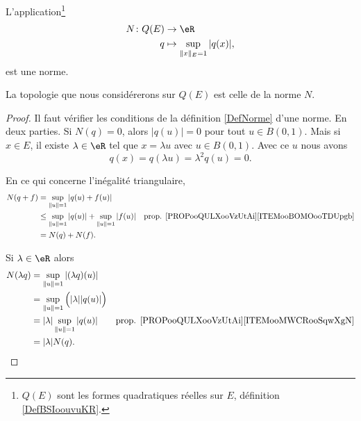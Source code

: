 \begin{lemma}       \label{LEMooWRCIooWkMpoF}
	L'application\footnote{\( Q(E)\) sont les formes quadratiques réelles sur \( E\), définition \ref{DefBSIoouvuKR}.}
	\begin{equation}  \label{EqZYBooZysmVh}
		\begin{aligned}
			N\colon Q(E) & \to \eR                            \\
			q            & \mapsto\sup_{\| x \|_E=1}| q(x) |,
		\end{aligned}
	\end{equation}
	est une norme.

	La topologie que nous considérerons sur \( Q(E)\) est celle de la norme \( N\).
\end{lemma}

\begin{proof}
	Il faut vérifier les conditions de la définition \ref{DefNorme} d'une norme. En deux parties.
	Si \( N(q)=0\), alors \( | q(u) |=0\) pour tout \( u\in B(0,1)\). Mais si \( x\in E\), il existe \( \lambda\in \eR\) tel que \( x=\lambda u\) avec \( u\in B(0,1)\). Avec ce \( u\) nous avons
	\begin{equation}
		q(x)=q(\lambda u)=\lambda^2q(u)=0.
	\end{equation}

	En ce qui concerne l'inégalité triangulaire,
	\begin{subequations}
		\begin{align}
			N(q+f) & =\sup_{\| u \|=1}| q(u)+f(u) |                                                                                         \\
			       & \leq \sup_{\| u \|=1}| q(u) |+\sup_{\| u \|=1}| f(u) | & \text{prop. \ref{PROPooQULXooVzUtAi}\ref{ITEMooBOMOooTDUpgb}} \\
			       & =N(q)+N(f).
		\end{align}
	\end{subequations}

	Si \( \lambda\in \eR\) alors
	\begin{subequations}
		\begin{align}
			N(\lambda q) & =\sup_{\| u \|=1}| (\lambda q)(u) |                                                                              \\
			             & =\sup_{\| u \|=1}\Big( | \lambda || q(u) | \Big)                                                                 \\
			             & =| \lambda |\sup_{\| u \|=1}| q(u) |             & \text{prop. \ref{PROPooQULXooVzUtAi}\ref{ITEMooMWCRooSqwXgN}} \\
			             & =| \lambda |N(q).
		\end{align}
	\end{subequations}
\end{proof}

